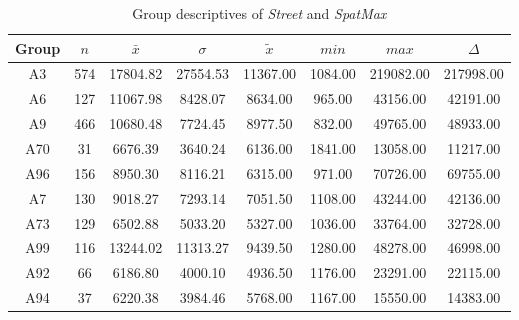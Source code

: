 \begin{table}[ht]
	\tiny
	\centering
	\begin{tabular}{c|c|c|c|c|c|c|c}
		\toprule
		Group & $n$ & $\bar{x}$ & $\sigma$ & $\tilde{x}$ & $min$ & $max$ & $\Delta$ \\  
		\midrule
		A3 & 574 & 17804.82 & 27554.53 & 11367.00 & 1084.00 & 219082.00 & 217998.00 \\ 
		A6 & 127 & 11067.98 & 8428.07 & 8634.00  & 965.00 & 43156.00 & 42191.00 \\ 
		A9 & 466 & 10680.48 & 7724.45 & 8977.50 & 832.00 & 49765.00 & 48933.00 \\ 
		A70 & 31 & 6676.39 & 3640.24 & 6136.00 & 1841.00 & 13058.00 & 11217.00 \\ 
		A96 & 156 & 8950.30 & 8116.21 & 6315.00 & 971.00 & 70726.00 & 69755.00 \\ 
		A7 & 130 & 9018.27 & 7293.14 & 7051.50 & 1108.00 & 43244.00 & 42136.00 \\ 
		A73 & 129 & 6502.88 & 5033.20 & 5327.00 & 1036.00 & 33764.00 & 32728.00 \\ 
		A99 & 116 & 13244.02 & 11313.27 & 9439.50 & 1280.00 & 48278.00 & 46998.00 \\ 
		A92 & 66 & 6186.80 & 4000.10 & 4936.50 & 1176.00 & 23291.00 & 22115.00 \\ 
		A94 & 37 & 6220.38 & 3984.46 & 5768.00 & 1167.00 & 15550.00 & 14383.00 \\ 
		\bottomrule
	\end{tabular}
	\caption{Group descriptives of \textit{Street} and \textit{SpatMax}}
	\label{tbl:descriptives_baysis_matched_Strasse_SMax}
	\vspace{-8mm}
\end{table}

